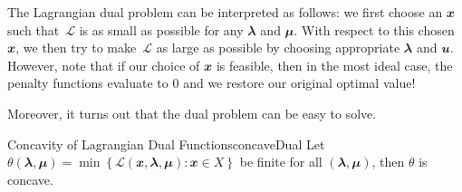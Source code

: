 \documentclass[math, code]{amznotes}
\theoremstyle{remark}
\begin{document}
The Lagrangian dual problem can be interpreted as follows: we first choose an $\mathbfit{x}$ such that~$\mathcal{L}$ is as small as possible for any $\mathbfit{\lambda}$ and $\mathbfit{\mu}$. With respect to this chosen $\mathbfit{x}$, we then try to make~$\mathcal{L}$ as large as possible by choosing appropriate $\mathbfit{\lambda}$ and $\mathbfit{u}$. However, note that if our choice of $\mathbfit{x}$ is feasible, then in the most ideal case, the penalty functions evaluate to $0$ and we restore our original optimal value!

Moreover, it turns out that the dual problem can be easy to solve.
\begin{thmbox}{Concavity of Lagrangian Dual Functions}{concaveDual}
    Let $\theta(\mathbfit{\lambda}, \mathbfit{\mu}) = \min\left\{\mathcal{L}(\mathbfit{x}, \mathbfit{\lambda}, \mathbfit{\mu}) \colon \mathbfit{x} \in X\right\}$ be finite for all $(\mathbfit{\lambda}, \mathbfit{\mu})$, then $\theta$ is concave.
\end{thmbox}
\end{document}
